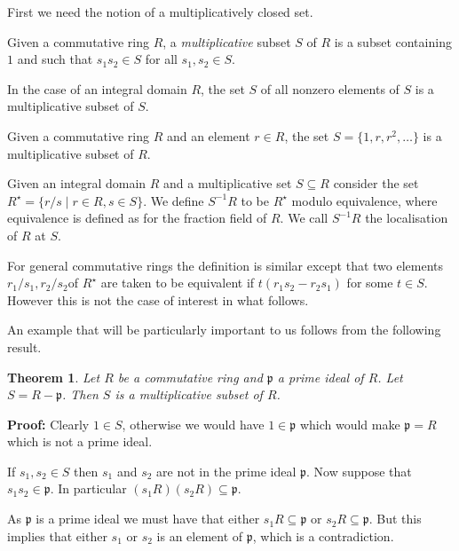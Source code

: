 \documentclass[10pt]{article}
\newtheorem{theorem}{Theorem}[section]
\newenvironment{definition}[1][Definition]{\begin{trivlist}
\item[\hskip \labelsep {\bfseries #1}]}{\end{trivlist}}
\newenvironment{example}[1][Example]{\begin{trivlist}
\item[\hskip \labelsep {\bfseries #1}]}{\end{trivlist}}
\begin{document}
First we need the notion of a multiplicatively closed set.

\begin{definition}
Given a commutative ring $R$, a \emph{multiplicative} subset $S$ of $R$ is a subset containing $1$ and such that $s_1s_2 \in S$ for all $s_1, s_2 \in S$.
\end{definition}

\begin{example}
In the case of an integral domain $R$, the set $S$ of all nonzero elements of $S$ is a multiplicative subset of $S$.
\end{example}

\begin{example}
Given a commutative ring $R$ and an element $r \in R$, the set $S = \{1, r, r^2, \ldots\}$ is a multiplicative subset of $R$.
\end{example}

\begin{definition}
Given an integral domain $R$ and a multiplicative set $S \subseteq R$ consider the set $R^\star = \{r/s \;|\; r \in R, s \in S\}$. We define $S^{-1}R$ to be $R^\star$ modulo equivalence, where equivalence is defined as for the fraction field of $R$. We call $S^{-1}R$ the localisation of $R$ at $S$.
\end{definition}

For general commutative rings the definition is similar except that two elements $r_1/s_1, r_2/s_2$of $R^\star$ are taken to be equivalent if $t(r_1s_2 - r_2s_1)$ for some $t \in S$. However this is not the case of interest in what follows.

An example that will be particularly important to us follows from the following result.

\begin{theorem}
Let $R$ be a commutative ring and $\mathfrak{p}$ a prime ideal of $R$. Let $S = R - \mathfrak{p}$. Then $S$ is a multiplicative subset of $R$.
\end{theorem}

\textbf{Proof:} Clearly $1 \in S$, otherwise we would have $1 \in \mathfrak{p}$ which would make $\mathfrak{p} = R$ which is not a prime ideal.

If $s_1, s_2 \in S$ then $s_1$ and $s_2$ are not in the prime ideal $\mathfrak{p}$. Now suppose that $s_1s_2 \in \mathfrak{p}$. In particular $(s_1R)(s_2R) \subseteq \mathfrak{p}$. 

As $\mathfrak{p}$ is a prime ideal we must have that either $s_1R \subseteq \mathfrak{p}$ or $s_2R \subseteq \mathfrak{p}$. But this implies that either $s_1$ or $s_2$ is an element of $\mathfrak{p}$, which is a contradiction.
\end{document}
